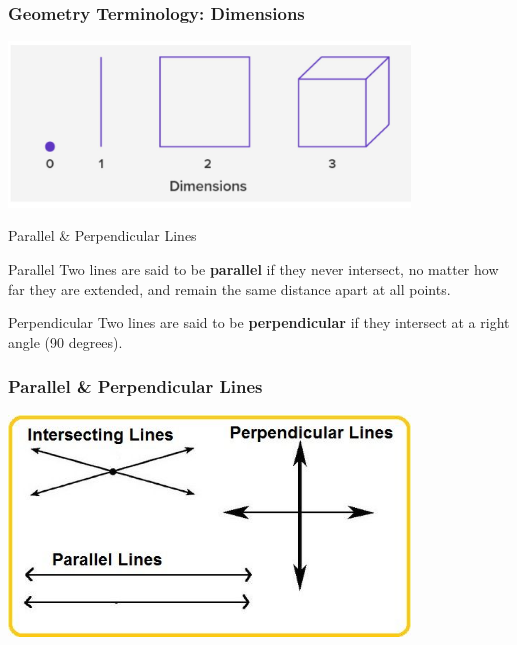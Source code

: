 \documentclass{beamer}
\begin{document}
\begin{frame}
    \frametitle{Geometry Terminology: Dimensions}
    \begin{center}
        \includegraphics[width=0.8\textwidth]{dimensions.jpeg} %
    \end{center}
\end{frame}

\begin{frame}{Parallel \& Perpendicular Lines}
    \begin{block}{Parallel}
      Two lines are said to be \textbf{parallel} if they never intersect, no matter how far they are extended, and remain the same distance apart at all points.
    \end{block}
    \begin{block}{Perpendicular}
        Two lines are said to be \textbf{perpendicular} if they intersect at a right angle (90 degrees).
    \end{block}
  \end{frame}


  \begin{frame}
    \frametitle{Parallel \& Perpendicular Lines}
    \begin{center}
        \includegraphics[width=0.8\textwidth]{parallel_perpendicular.jpg} %
    \end{center}
\end{frame}
\end{document}
